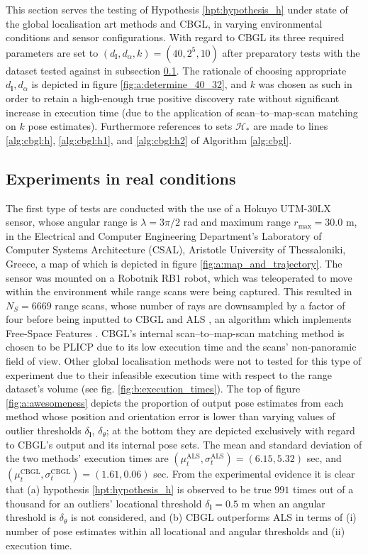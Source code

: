This section serves the testing of Hypothesis \ref{hpt:hypothesis_h} under
state of the global localisation art methods and CBGL, in varying environmental
conditions and sensor configurations. With regard to CBGL its three required
parameters are set to $(d_{\bm{l}},d_{\alpha},k) = (40, 2^5, 10)$ after
preparatory tests with the dataset tested against in subsection
\ref{subsec:exp_a}. The rationale of choosing appropriate
$d_{\bm{l}},d_{\alpha}$ is depicted in figure \ref{fig:a:determine_40_32}, and
$k$ was chosen as such in order to retain a high-enough true positive discovery
rate without significant increase in execution time (due to the application of
scan--to--map-scan matching on $k$ pose estimates). Furthermore references to
sets $\mathcal{H}_{\ast}$ are made to lines \ref{alg:cbgl:h},
\ref{alg:cbgl:h1}, and \ref{alg:cbgl:h2} of Algorithm \ref{alg:cbgl}.


\subsection{Experiments in real conditions}
\label{subsec:exp_a}

The first type of tests are conducted with the use of a Hokuyo UTM-30LX
sensor, whose angular range is $\lambda = 3\pi/2$ rad and maximum range
$r_{\max} = 30.0$ m, in the  Electrical and Computer Engineering Department's
Laboratory of Computer Systems Architecture (CSAL), Aristotle University of
Thessaloniki, Greece, a map of which is depicted in figure
\ref{fig:a:map_and_trajectory}. The sensor was mounted on a Robotnik RB1 robot,
which was teleoperated to move within the environment while range scans were
being captured. This resulted in $N_{S}=6669$ range scans, whose number of rays
are downsampled by a factor of four before being inputted to CBGL and ALS
\cite{als_jp}, an algorithm which implements Free-Space Features
\cite{als_eth}. CBGL's internal scan--to--map-scan matching method is chosen
to be PLICP \cite{Censi2008c} due to its low execution time and the scans'
non-panoramic field of view.  Other global localisation methods were not to
tested for this type of experiment due to their infeasible execution time with
respect to the range dataset's volume (see fig. \ref{fig:b:execution_times}).
The top of figure \ref{fig:a:awesomeness} depicts the proportion of output pose
estimates from each method whose position and orientation error is lower than
varying values of outlier thresholds $\delta_{\bm{l}}$, $\delta_{\theta}$; at
the bottom they are depicted exclusively with regard to CBGL's output and its
internal pose sets. The mean and standard deviation of the two methods'
execution times are $(\mu_t^{\text{ALS}}, \sigma_t^{\text{ALS}}) = (6.15,
5.32)$ sec, and $(\mu_t^{\text{CBGL}}, \sigma_t^{\text{CBGL}}) = (1.61, 0.06)$
sec. From the experimental evidence it is clear that (a) hypothesis
\ref{hpt:hypothesis_h} is observed to be true $991$ times out of a thousand for
an outliers' locational threshold $\delta_{\bm{l}} = 0.5$ m when an angular
threshold is $\delta_{\theta}$ is not considered, and (b) CBGL outperforms ALS
in terms of (i) number of pose estimates within all locational and angular
thresholds and (ii) execution time.

